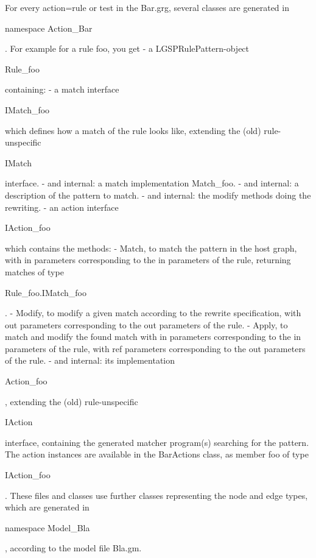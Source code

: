 For every action=rule or test in the Bar.grg, 
several classes are generated in \begin{csharplet}namespace Action_Bar\end{csharplet}.
For example for a rule foo, you get
- a LGSPRulePattern-object \begin{csharplet}Rule_foo\end{csharplet} containing:
  - a match interface \begin{csharplet}IMatch_foo\end{csharplet} which defines how a match of the rule looks like, extending the (old) rule-unspecific \begin{csharplet}IMatch\end{csharplet} interface.
  - and internal: a match implementation Match_foo.
  - and internal: a description of the pattern to match.
  - and internal: the modify methods doing the rewriting.
- an action interface \begin{csharplet}IAction_foo\end{csharplet} which contains the methods:
  - Match, to match the pattern in the host graph,
     with in parameters corresponding to the in parameters of the rule,
	 returning matches of type \begin{csharplet}Rule_foo.IMatch_foo\end{csharplet}.
  - Modify, to modify a given match according to the rewrite specification,
     with out parameters corresponding to the out parameters of the rule.
  - Apply, to match and modify the found match 
     with in parameters corresponding to the in parameters of the rule,
     with ref parameters corresponding to the out parameters of the rule.
- and internal: its implementation \begin{csharplet}Action_foo\end{csharplet},
   extending the (old) rule-unspecific \begin{csharplet}IAction\end{csharplet} interface,
   containing the generated matcher program(s) searching for the pattern.
The action instances are available in the BarActions class,
  as member foo of type \begin{csharplet}IAction_foo\end{csharplet}.
These files and classes use further classes representing the node and edge types,
which are generated in \begin{csharplet}namespace Model_Bla\end{csharplet}, according to the model file Bla.gm.

